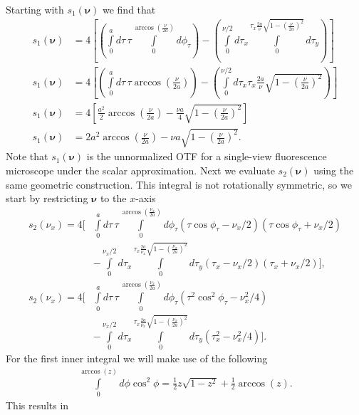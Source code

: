 \documentclass[11pt]{article}
\providecommand{\bs}[1]{\boldsymbol{#1}}
\begin{document}
Starting with $s_1(\bs{\nu})$ we find that
\begin{align}
  s_1(\bs{\nu}) &= 4\left[\left(\int\limits_0^a d\tau\, \tau\int\limits_0^{\arccos\left(\frac{\nu}{2a}\right)}d\phi_{\tau}\right) - \left(\int\limits_0^{\nu/2}d\tau_x \int\limits_0^{\tau_x\frac{2a}{\nu}\sqrt{1 - \left(\frac{\nu}{2a}\right)^2}}d\tau_y\right)\right]\\
  s_1(\bs{\nu}) &= 4\left[\left(\int\limits_0^a d\tau\,\tau\arccos\left(\frac{\nu}{2a}\right)\right) - \left(\int\limits_0^{\nu/2}d\tau_x \tau_x \frac{2a}{\nu}\sqrt{1 - \left(\frac{\nu}{2a}\right)^2}\right)\right]\\
  s_1(\bs{\nu}) &= 4\left[\frac{a^2}{2}\arccos\left(\frac{\nu}{2a}\right) - \frac{\nu a}{4}\sqrt{1 - \left(\frac{\nu}{2a}\right)^2}\right]\\
  s_1(\bs{\nu}) &= 2a^2\arccos\left(\frac{\nu}{2a}\right) - \nu a\sqrt{1 - \left(\frac{\nu}{2a}\right)^2}.
\end{align}
Note that $s_1(\bs{\nu})$ is the unnormalized OTF for a single-view
fluorescence microscope under the scalar approximation. Next we evaluate
$s_2(\bs{\nu})$ using the same geometric construction. This integral is not
rotationally symmetric, so we start by restricting $\bs{\nu}$ to the $x$-axis
\begin{align}
  s_2(\nu_x) = 4\Bigg[&\int\limits_0^a d\tau\, \tau \int\limits_0^{\arccos\left(\frac{\nu_x}{2a}\right)}d\phi_{\tau}(\tau\cos\phi_{\tau} - \nu_x/2)(\tau\cos\phi_{\tau} + \nu_x/2)\nonumber \\ &- \int\limits_0^{\nu_x/2}d\tau_x \int\limits_0^{\tau_x \frac{2a}{\nu_x}\sqrt{1 - \left(\frac{\nu_x}{2a}\right)^2}}d\tau_y(\tau_x - \nu_x/2)(\tau_x + \nu_x/2)\Bigg],\\
  s_2(\nu_x) = 4\Bigg[&\int\limits_0^a d\tau\, \tau\int\limits_0^{\arccos\left(\frac{\nu_x}{2a}\right)}d\phi_{\tau}(\tau^2\cos^2\phi_{\tau} - \nu_x^2/4)\nonumber \\ &- \int\limits_0^{\nu_x/2}d\tau_x \int\limits_0^{\tau_x\frac{2 a}{\nu_x}\sqrt{1 - \left(\frac{\nu_x}{2a}\right)^2}}d\tau_y(\tau_x^2 - \nu_x^2/4)\Bigg].
\end{align}
For the first inner integral we will make use of the following
\begin{align}
  \int\limits_0^{\arccos(z)} d\phi \cos^2\phi = \frac{1}{2}z\sqrt{1 - z^2} + \frac{1}{2}\arccos(z).
\end{align}
This results in
\end{document}
